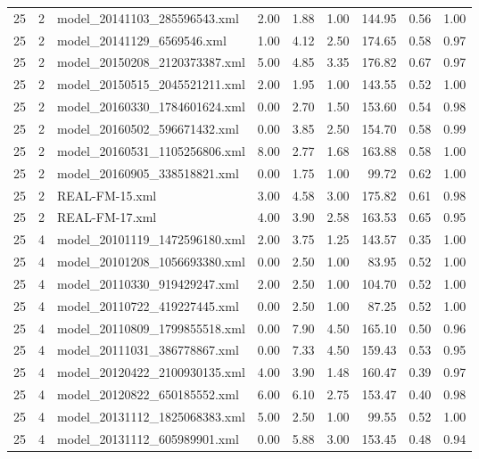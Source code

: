 \begin{table}[ht]
\begin{tabular}{rrlrrrrrr}
   25 &   2 & model\_20141103\_285596543.xml & 2.00 & 1.88 & 1.00 & 144.95 & 0.56 & 1.00 \\ 
   25 &   2 & model\_20141129\_6569546.xml & 1.00 & 4.12 & 2.50 & 174.65 & 0.58 & 0.97 \\ 
   25 &   2 & model\_20150208\_2120373387.xml & 5.00 & 4.85 & 3.35 & 176.82 & 0.67 & 0.97 \\ 
   25 &   2 & model\_20150515\_2045521211.xml & 2.00 & 1.95 & 1.00 & 143.55 & 0.52 & 1.00 \\ 
   25 &   2 & model\_20160330\_1784601624.xml & 0.00 & 2.70 & 1.50 & 153.60 & 0.54 & 0.98 \\ 
   25 &   2 & model\_20160502\_596671432.xml & 0.00 & 3.85 & 2.50 & 154.70 & 0.58 & 0.99 \\ 
   25 &   2 & model\_20160531\_1105256806.xml & 8.00 & 2.77 & 1.68 & 163.88 & 0.58 & 1.00 \\ 
   25 &   2 & model\_20160905\_338518821.xml & 0.00 & 1.75 & 1.00 & 99.72 & 0.62 & 1.00 \\ 
   25 &   2 & REAL-FM-15.xml & 3.00 & 4.58 & 3.00 & 175.82 & 0.61 & 0.98 \\ 
   25 &   2 & REAL-FM-17.xml & 4.00 & 3.90 & 2.58 & 163.53 & 0.65 & 0.95 \\ 
   25 &   4 & model\_20101119\_1472596180.xml & 2.00 & 3.75 & 1.25 & 143.57 & 0.35 & 1.00 \\ 
   25 &   4 & model\_20101208\_1056693380.xml & 0.00 & 2.50 & 1.00 & 83.95 & 0.52 & 1.00 \\ 
   25 &   4 & model\_20110330\_919429247.xml & 2.00 & 2.50 & 1.00 & 104.70 & 0.52 & 1.00 \\ 
   25 &   4 & model\_20110722\_419227445.xml & 0.00 & 2.50 & 1.00 & 87.25 & 0.52 & 1.00 \\ 
   25 &   4 & model\_20110809\_1799855518.xml & 0.00 & 7.90 & 4.50 & 165.10 & 0.50 & 0.96 \\ 
   25 &   4 & model\_20111031\_386778867.xml & 0.00 & 7.33 & 4.50 & 159.43 & 0.53 & 0.95 \\ 
   25 &   4 & model\_20120422\_2100930135.xml & 4.00 & 3.90 & 1.48 & 160.47 & 0.39 & 0.97 \\ 
   25 &   4 & model\_20120822\_650185552.xml & 6.00 & 6.10 & 2.75 & 153.47 & 0.40 & 0.98 \\ 
   25 &   4 & model\_20131112\_1825068383.xml & 5.00 & 2.50 & 1.00 & 99.55 & 0.52 & 1.00 \\ 
   25 &   4 & model\_20131112\_605989901.xml & 0.00 & 5.88 & 3.00 & 153.45 & 0.48 & 0.94 \\ 

\end{tabular}
\end{table}
